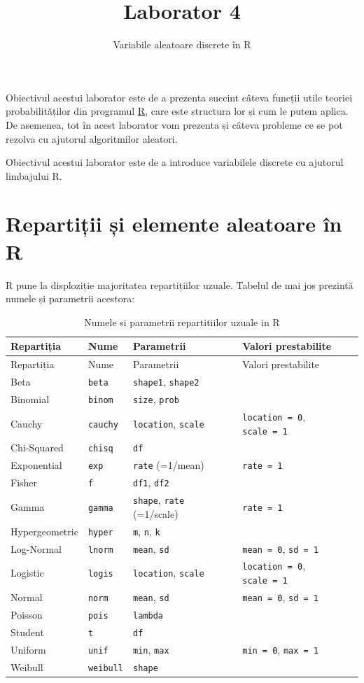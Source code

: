 \documentclass[]{article}
\title{Laborator 4}
\subtitle{Variabile aleatoare discrete în R}
\author{}
\date{}
\begin{document}
\maketitle

\thispagestyle{fancy}

Obiectivul acestui laborator este de a prezenta succint câteva funcții
utile teoriei probabilităților din programul
\href{https://cran.r-project.org/}{R}, care este structura lor și cum le
putem aplica. De asemenea, tot în acest laborator vom prezenta și câteva
probleme ce se pot rezolva cu ajutorul algoritmilor aleatori.

Obiectivul acestui laborator este de a introduce variabilele discrete cu
ajutorul limbajului R.

\hypertarget{repartiux21bii-ux219i-elemente-aleatoare-uxeen-r}{%
\section{Repartiții și elemente aleatoare în
R}\label{repartiux21bii-ux219i-elemente-aleatoare-uxeen-r}}

R pune la disploziție majoritatea repartițiilor uzuale. Tabelul de mai
jos prezintă numele și parametrii acestora:

\begin{longtable}[]{@{}llll@{}}
\caption{Numele si parametrii repartitiilor uzuale in R}\tabularnewline
\toprule
Repartiția & Nume & Parametrii & Valori prestabilite\tabularnewline
\midrule
\endfirsthead
\toprule
Repartiția & Nume & Parametrii & Valori prestabilite\tabularnewline
\midrule
\endhead
Beta & \texttt{beta} & \texttt{shape1}, \texttt{shape2} &\tabularnewline
Binomial & \texttt{binom} & \texttt{size}, \texttt{prob}
&\tabularnewline
Cauchy & \texttt{cauchy} & \texttt{location}, \texttt{scale} &
\texttt{location\ =\ 0}, \texttt{scale\ =\ 1}\tabularnewline
Chi-Squared & \texttt{chisq} & \texttt{df} &\tabularnewline
Exponential & \texttt{exp} & \texttt{rate} (=1/mean) &
\texttt{rate\ =\ 1}\tabularnewline
Fisher & \texttt{f} & \texttt{df1}, \texttt{df2} &\tabularnewline
Gamma & \texttt{gamma} & \texttt{shape}, \texttt{rate} (=1/scale) &
\texttt{rate\ =\ 1}\tabularnewline
Hypergeometric & \texttt{hyper} & \texttt{m}, \texttt{n}, \texttt{k}
&\tabularnewline
Log-Normal & \texttt{lnorm} & \texttt{mean}, \texttt{sd} &
\texttt{mean\ =\ 0}, \texttt{sd\ =\ 1}\tabularnewline
Logistic & \texttt{logis} & \texttt{location}, \texttt{scale} &
\texttt{location\ =\ 0}, \texttt{scale\ =\ 1}\tabularnewline
Normal & \texttt{norm} & \texttt{mean}, \texttt{sd} &
\texttt{mean\ =\ 0}, \texttt{sd\ =\ 1}\tabularnewline
Poisson & \texttt{pois} & \texttt{lambda} &\tabularnewline
Student & \texttt{t} & \texttt{df} &\tabularnewline
Uniform & \texttt{unif} & \texttt{min}, \texttt{max} &
\texttt{min\ =\ 0}, \texttt{max\ =\ 1}\tabularnewline
Weibull & \texttt{weibull} & \texttt{shape} &\tabularnewline
\bottomrule
\end{longtable}
\end{document}
